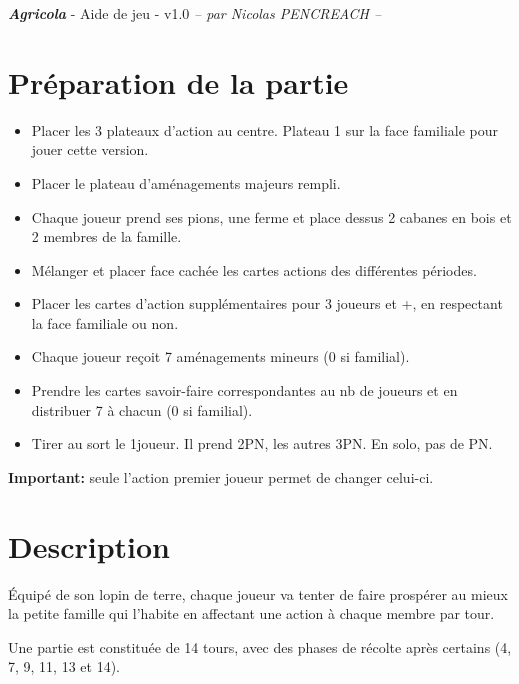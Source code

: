 \documentclass[10pt, a4paper]{article}	%
\begin{document}
{\LARGE \textbf{\textit{Agricola}}}
{\large - Aide de jeu - v1.0}\textit{ -- par Nicolas PENCREACH --}

\setlength{\columnseprule}{0.002cm}	%
\begin{multicols}{3}				%


\section{Préparation de la partie}

\begin{itemize}
\item Placer les 3 plateaux d'action au centre. Plateau 1 sur la face familiale pour jouer cette version.
\item Placer le plateau d'aménagements majeurs rempli.
\item Chaque joueur prend ses pions, une ferme et place dessus 2 cabanes en bois et 2 membres de la famille.
\item Mélanger et placer face cachée les cartes actions des différentes périodes.
\item Placer les cartes d'action supplémentaires pour 3 joueurs et +, en respectant la face familiale ou non.
\item Chaque joueur reçoit 7 aménagements mineurs (0 si familial).
\item Prendre les cartes savoir-faire correspondantes au nb de joueurs et en distribuer 7 à chacun (0 si familial).
\item Tirer au sort le 1\ier joueur. Il prend 2PN, les autres 3PN. En solo, pas de PN.
\end{itemize}

\textbf{Important:} seule l'action \og premier joueur\fg{} permet de changer celui-ci.


\section{Description}
Équipé de son lopin de terre, chaque joueur va tenter de faire prospérer au mieux la petite famille qui l'habite en affectant une action à chaque membre par tour.

Une partie est constituée de 14 tours, avec des phases de récolte après certains (4, 7, 9, 11, 13 et 14).




\end{multicols}
\end{document}
